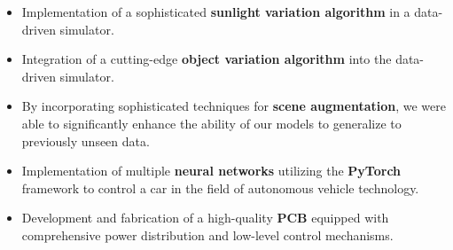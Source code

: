 \documentclass[10pt,a4paper]{altacv}
\begin{document}

\begin{fullwidth}
\makecvheader
\end{fullwidth}




\begin{itemize}
\item Implementation of a sophisticated \textbf{sunlight variation algorithm} in a data-driven simulator.  
\item  Integration of a cutting-edge \textbf{object variation algorithm} into the data-driven simulator.
\item By incorporating sophisticated techniques for \textbf{scene augmentation}, we were able to significantly enhance the ability of our models to generalize to previously unseen data.
\end{itemize}
\medskip
\divider
{}
\begin{itemize}
\item Implementation of multiple \textbf{neural networks} utilizing the \textbf{PyTorch} framework to control a car in the field of autonomous vehicle technology.
\item Development and fabrication of a high-quality \textbf{PCB} equipped with comprehensive power distribution and low-level control mechanisms.
\end{itemize}
\end{document}
